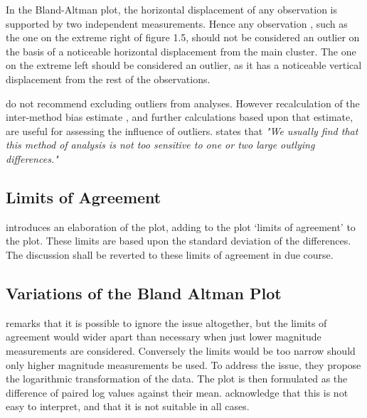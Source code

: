 \documentclass[12pt, a4paper]{report}
\begin{document}
	
	
	In the Bland-Altman plot, the horizontal displacement of any
	observation is supported by two independent measurements. Hence
	any observation , such as the one on the extreme right of figure
	1.5, should not be considered an outlier on the basis of a
	noticeable horizontal displacement from the main cluster. The one
	on the extreme left should be considered an outlier, as it has a
	noticeable vertical displacement from the rest of the
	observations.
	
	\citet*{BA99} do not recommend excluding outliers from analyses.
	However recalculation of the inter-method bias estimate , and
	further calculations based upon that estimate, are useful for
	assessing the influence of outliers.\citep{BA99} states that
	\emph{"We usually find that this method of analysis is not too
		sensitive to one or two large outlying differences."}
	
	\subsection{Limits of Agreement}
	\citet{BA86} introduces an elaboration of the plot, adding to the
	plot `limits of agreement' to the plot. These limits are based
	upon the standard deviation of the differences. The discussion
	shall be reverted to these limits of agreement in due course.
	
	\subsection{Variations of the Bland Altman Plot}
	\citet{BA99} remarks that it is possible to ignore the issue
	altogether, but the limits of agreement would wider apart than
	necessary when just lower magnitude measurements are considered.
	Conversely the limits would be too narrow should only higher
	magnitude measurements be used. To address the issue, they propose
	the logarithmic transformation of the data. The plot is then
	formulated as the difference of paired log values against their
	mean. \citet{BA99} acknowledge that this is not easy to interpret,
	and that it is not suitable in all cases.
	
\end{document}
